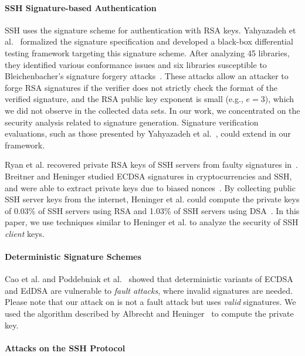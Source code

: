 \paragraph{SSH Signature-based Authentication}

SSH uses the \pkcsone signature scheme for authentication with RSA keys. Yahyazadeh et al.~\cite{CCS:YCLHDI21} formalized the \pkcsone signature specification and developed a black-box differential testing framework targeting this signature scheme. After analyzing 45 libraries, they identified various conformance issues and six libraries susceptible to Bleichenbacher's signature forgery attacks~\cite{bleichenbacher2006}. These attacks allow an attacker to forge RSA signatures if the verifier does not strictly check the \pkcsone format of the verified signature, and the RSA public key exponent is small (e.g., $e=3$), which we did not observe in the collected data sets. In our work, we concentrated on the security analysis related to signature generation. Signature verification evaluations, such as those presented by Yahyazadeh et al.~\cite{CCS:YCLHDI21}, could extend in our framework.

Ryan et al. recovered private RSA keys of SSH servers from faulty signatures in~\cite{CCS:RHSH23}. Breitner and Heninger studied ECDSA signatures in cryptocurrencies and SSH, and were able to extract private keys due to biased nonces~\cite{FC:BreHen19}. By collecting public SSH server keys from the internet, Heninger et al. could compute the private keys of 0.03\% of SSH servers using RSA and 1.03\% of SSH servers using DSA~\cite{USENIX:HDWH12}. In this paper, we use techniques similar to Heninger et al. to analyze the security of SSH \emph{client} keys.

\paragraph{Deterministic Signature Schemes}

Cao et al. and Poddebniak et al.~\cite{EUROSP:PSSLR18,RSA:CSCCFW22} showed that deterministic variants of ECDSA and EdDSA are vulnerable to \emph{fault attacks}, where invalid signatures are needed. Please note that our attack on \putty is not a fault attack but uses \emph{valid} signatures. We used the algorithm described by Albrecht and Heninger~\cite{EC:AlbHen21} to compute the private key.

\paragraph{Attacks on the SSH Protocol}


